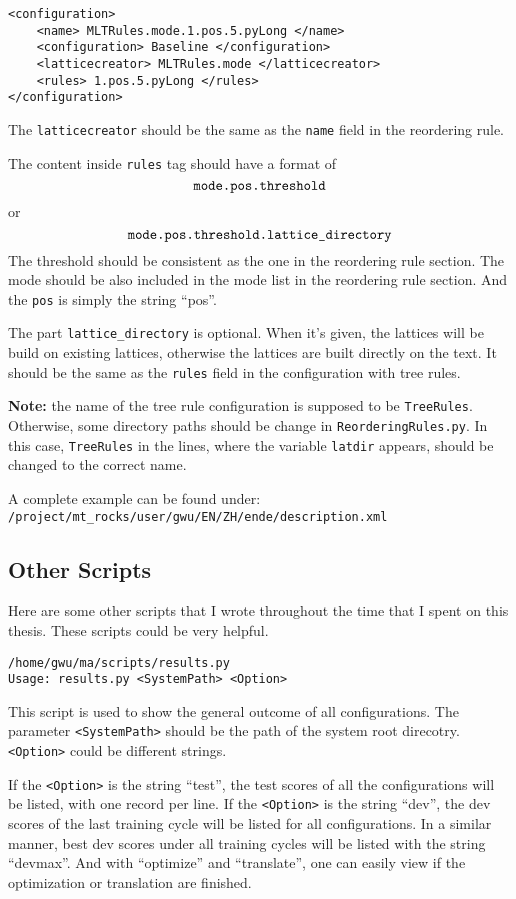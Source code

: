 \begin{Verbatim}[frame=single]
<configuration>
    <name> MLTRules.mode.1.pos.5.pyLong </name>
    <configuration> Baseline </configuration>
    <latticecreator> MLTRules.mode </latticecreator>
    <rules> 1.pos.5.pyLong </rules>
</configuration>
\end{Verbatim}
The \verb|latticecreator| should be the same as the \verb|name| field in the reordering rule. 

The content inside \verb|rules| tag should have a format of $$\verb|mode.pos.threshold|$$ or $$\verb|mode.pos.threshold.lattice_directory|$$ The threshold should be consistent as the one in the reordering rule section. The mode should be also included in the mode list in the reordering rule section. And the \verb|pos| is simply the string ``pos''.

The part \verb|lattice_directory| is optional. When it's given, the lattices will be build on existing lattices, otherwise the lattices are built directly on the text. It should be the same as the \verb|rules| field in the configuration with tree rules. 


\label{note}\textbf{Note:} the name of the tree rule configuration is supposed to be \verb|TreeRules|. Otherwise, some directory paths should be change in \verb|ReorderingRules.py|. In this case, \verb|TreeRules| in the lines, where the variable \verb|latdir| appears, should be changed to the correct name.


A complete example can be found under:\\
\verb|/project/mt_rocks/user/gwu/EN/ZH/ende/description.xml|

\subsection{Other Scripts}

Here are some other scripts that I wrote throughout the time that I spent on this thesis. These scripts could be very helpful.

\verb|/home/gwu/ma/scripts/results.py|\\
\verb|Usage: results.py <SystemPath> <Option>|

This script is used to show the general outcome of all configurations. The parameter \verb|<SystemPath>| should be the path of the system root direcotry. \verb|<Option>| could be different strings.

If the \verb|<Option>| is the string ``test'', the test scores of all the configurations will be listed, with one record per line. If the \verb|<Option>| is the string ``dev'', the dev scores of the last training cycle will be listed for all configurations. In a similar manner, best dev scores under all training cycles will be listed with the string ``devmax''. And with ``optimize'' and ``translate'', one can easily view if the optimization or translation are finished.

